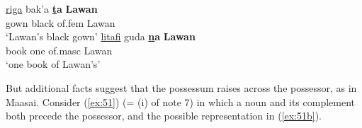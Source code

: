 \documentclass[output=paper
,modfonts
,nonflat]{langsci/langscibook}
\begin{document}
\begin{exe}
	 \citep[301]{Newman2000}
	\xlist
	\ex 
	\gll \underline{riga}   bak’a   \textbf{\underline{t}a}       \textbf{Lawan} \\
	gown   black   of.fem    Lawan\\
	\glt `Lawan’s black gown'  	
	\ex 
	\gll \underline{litafi}     guda \textbf{\underline{n}a}       \textbf{Lawan}\\
	book one  of.masc  Lawan\\
	\glt `one book of Lawan's'
	\endxlist
\end{exe}
But additional facts suggest that the possessum raises across the possessor, as in Maasai.  Consider (\ref{ex:51}) (= (i) of note 7) in which a noun and its complement both precede the possessor, and the possible representation in (\ref{ex:51b}). 
\end{document}
